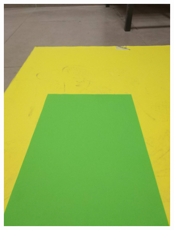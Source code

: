 \documentclass[a4paper,12pt]{article}
\begin{document}
\begin{appendices}
\begin{figure}[H]
\begin{subfigure}{.5\textwidth}
		\includegraphics[width=.98\textwidth]{3}
	\end{subfigure}%
	\begin{subfigure}{.5\textwidth}
		\centering

\end{subfigure}
\end{figure}
\end{appendices}
\end{document}
